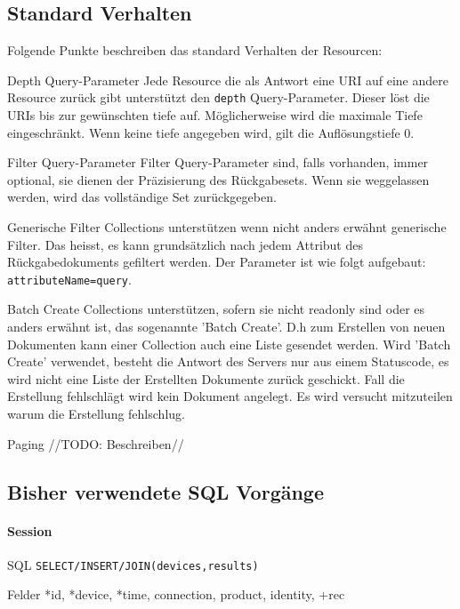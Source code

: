\documentclass[10pt,a4paper]{scrartcl}
\begin{document}
\subsection{Standard Verhalten}
Folgende Punkte beschreiben das standard Verhalten der Resourcen:
\begin{description*}
	\item[Depth Query-Parameter] Jede Resource die als Antwort eine URI auf eine andere Resource zurück gibt						 unterstützt den \texttt{depth} Query-Parameter. Dieser löst die URIs bis zur gewünschten tiefe auf. Möglicherweise wird die maximale Tiefe eingeschränkt. Wenn keine tiefe angegeben wird, gilt die Auflösungstiefe 0.
	\item[Filter Query-Parameter] Filter Query-Parameter sind, falls vorhanden, immer optional, sie dienen der Präzisierung des Rückgabesets. Wenn sie weggelassen werden, wird das vollständige Set zurückgegeben.
	\item[Generische Filter] Collections unterstützen wenn nicht anders erwähnt generische Filter. Das heisst, es kann grundsätzlich nach jedem Attribut des Rückgabedokuments gefiltert werden. Der Parameter ist wie folgt aufgebaut: \texttt{attributeName=query}.
	\item[Batch Create] Collections unterstützen, sofern sie nicht readonly sind oder es anders erwähnt ist, das sogenannte 'Batch Create'. D.h zum Erstellen von neuen Dokumenten kann einer Collection auch eine Liste gesendet werden. Wird 'Batch Create' verwendet, besteht die Antwort des Servers nur aus einem Statuscode, es wird nicht eine Liste der Erstellten Dokumente zurück geschickt. Fall die Erstellung fehlschlägt wird kein Dokument angelegt. Es wird versucht mitzuteilen warum die Erstellung fehlschlug.
	\item[Paging] //TODO: Beschreiben//  
\end{description*}
 
\pagebreak
\subsection{Bisher verwendete SQL Vorgänge}
\paragraph{Session}
\begin{description*}
	\item[SQL] \texttt{SELECT/INSERT/JOIN(devices,results)}
	\item[Felder] *id, *device, *time, connection, product, identity, +rec
\end{description*}
\end{document}
